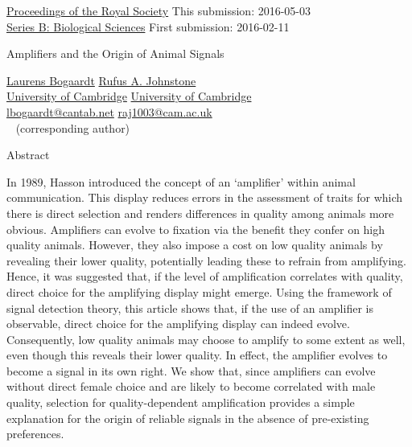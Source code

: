 \documentclass[a4paper,12pt]{article}
\numberwithin{equation}{section}
\numberwithin{figure}{section}
\begin{document}
\label{sec:Cover Page}

\href{http://www.royalsocietypublishing.org}{Proceedings of the Royal Society} \hfill This submission: 2016-05-03\\
\href{http://rspb.royalsocietypublishing.org}{Series B: Biological Sciences} \hfill First submission: 2016-02-11

\vspace{70mm}

\begin{center}
\begin{LARGE}
\begin{bf}
Amplifiers and the Origin of Animal Signals
\end{bf}
\end{LARGE}
\end{center}

\vfill

\href{http://www.bogaardtresearch.tk}{Laurens Bogaardt} \hfill \href{http://www.zoo.cam.ac.uk/directory/rufus-johnstone}{Rufus A. Johnstone}\\
\href{http://www.cam.ac.uk}{University of Cambridge} \hfill \href{http://www.cam.ac.uk}{University of Cambridge}\\
\href{mailto:lbogaardt@cantab.net}{lbogaardt@cantab.net} \hfill \href{mailto:raj1003@cam.ac.uk}{raj1003@cam.ac.uk}\\
\hphantom~ \hfill (corresponding author)

\vspace{10mm}

\newpage


\begin{bf}
Abstract
\end{bf}
\newline
In 1989, Hasson introduced the concept of an `amplifier' within animal communication. This display reduces errors in the assessment of traits for which there is direct selection and renders differences in quality among animals more obvious. Amplifiers can evolve to fixation via the benefit they confer on high quality animals. However, they also impose a cost on low quality animals by revealing their lower quality, potentially leading these to refrain from amplifying. Hence, it was suggested that, if the level of amplification correlates with quality, direct choice for the amplifying display might emerge. Using the framework of signal detection theory, this article shows that, if the use of an amplifier is observable, direct choice for the amplifying display can indeed evolve. Consequently, low quality animals may choose to amplify to some extent as well, even though this reveals their lower quality. In effect, the amplifier evolves to become a signal in its own right. We show that, since amplifiers can evolve without direct female choice and are likely to become correlated with male quality, selection for quality-dependent amplification provides a simple explanation for the origin of reliable signals in the absence of pre-existing preferences.
\end{document}
